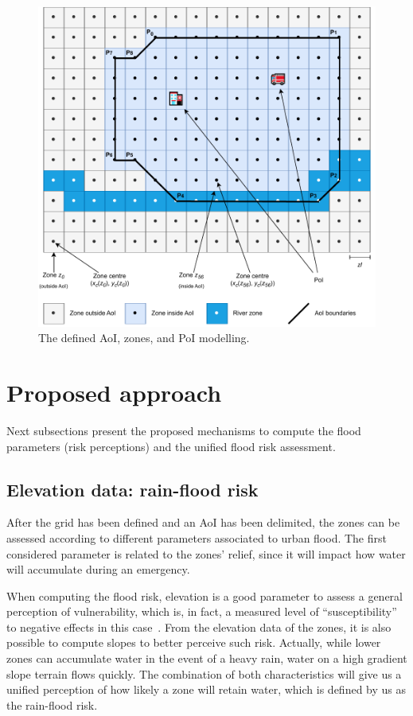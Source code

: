 \begin{refsection}
\begin{figure}[ht]
  \centering
  \includegraphics[width=0.9\linewidth]{Chapters/6-Flood/figs/zones_and_pois.pdf}
  \caption{The defined AoI, zones, and PoI modelling.}\label{fig:zones_and_pois}
\end{figure}

\section{Proposed approach}\label{sec:proposal}

Next subsections present the proposed mechanisms to compute the flood parameters (risk perceptions) and the unified flood risk assessment.

\subsection{Elevation data: rain-flood risk}

After the grid has been defined and an AoI has been delimited, the zones can be assessed according to different parameters associated to urban flood. The first considered parameter is related to the zones' relief, since it will impact how water will accumulate during an emergency. 

When computing the flood risk, elevation is a good parameter to assess a general perception of vulnerability, which is, in fact, a measured level of ``susceptibility'' to negative effects in this case~\cite{elevation1,elevation2,elevation3}. From the elevation data of the zones, it is also possible to compute slopes to better perceive such risk. Actually, while lower zones can accumulate water in the event of a heavy rain, water on a high gradient slope terrain flows quickly. The combination of both characteristics will give us a unified perception of how likely a zone will retain water, which is defined by us as the rain-flood risk. 


\end{refsection}
